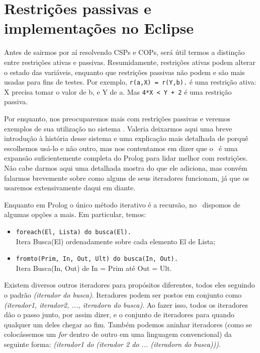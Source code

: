 \documentclass{article}
\begin{document}
\section{Restrições passivas e implementações no Eclipse}

Antes de sairmos por aí resolvendo CSPs e COPs, será útil termos a distinção entre restrições ativas e passivas. Resumidamente, restrições ativas podem alterar o estado das variáveis, enquanto que restrições passivas não podem e são mais usadas para fins de testes. Por exemplo, {\tt r(a,X) = r(Y,b).} é uma restrição ativa: X precisa tomar o valor de b, e Y de a. Mas {\tt 4*X < Y + 2} é uma restrição passiva.

Por enquanto, nos preocuparemos mais com restrições passivas e veremos exemplos de sua utilização no sistema \eclipse. Valeria deixarmos aqui uma breve introdução à história desse sistema e uma explicação mais detalhada de porquê escolhemos usá-lo e não outro, mas nos contentamos em dizer que o \eclipse\ é uma expansão suficientemente completa do Prolog para lidar melhor com restrições. Não cabe darmos aqui uma detalhada mostra do que ele adiciona, mas convém falarmos brevemente
sobre como alguns de seus iteradores funcionam, já que os usaremos extensivamente daqui em diante.

Enquanto em Prolog o único método iterativo é a recursão, no \eclipse\ dispomos de algumas opções a mais. Em particular, temos:

\begin{itemize}
  \item {\tt foreach(El, Lista) do busca(El).}
    \\ Itera Busca(El) ordenadamente sobre cada elemento El de Lista;
  \item {\tt fromto(Prim, In, Out, Ult) do busca(In, Out).}
    \\ Itera Busca(In, Out) de In = Prim até Out = Ult.
\end{itemize}

Existem diversos outros iteradores para propósitos diferentes, todos eles seguindo o padrão  \textit{(iterador do busca)}. Iteradores podem ser postos em conjunto como \textit{(iterador1, iterador2, ..., iteradorn do busca)}. Ao fazer isso, todos os iteradores dão o passo junto, por assim dizer, e o conjunto de iteradores para quando qualquer um deles chegar ao fim. Também podemos aninhar iteradores (como se colocássemos um \textit{for} dentro de outro em uma linguagem
convencional) da seguinte forma: \textit{(iterador1 do (iterador 2 do ... (iteradorn do busca)))}.
\end{document}
